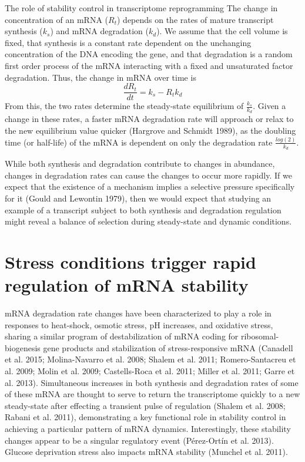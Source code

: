 The role of stability control in transcriptome
reprogramming The change in concentration of an mRNA ($R_t$) depends
on the rates of mature transcript synthesis ($k_s$) and mRNA
degradation ($k_d$). We assume that the cell volume is fixed, that
synthesis is a constant rate dependent on the unchanging concentration
of the DNA encoding the gene, and that degradation is a random first
order process of the mRNA interacting with a fixed and unsaturated
factor degradation. Thus, the change in mRNA over time is $$
\frac{dR_t}{dt} = k_s - R_t k_d$$ From this, the two rates determine
the steady-state equilibrium of $\frac{k_s}{k_d}$. Given a change in
these rates, a faster mRNA degradation rate will approach or relax to
the new equilibrium value quicker (Hargrove and Schmidt 1989), as the
doubling time (or half-life) of the mRNA is dependent on only the
degradation rate $\frac{log(2)}{k_d}$.  

While both synthesis and
degradation contribute to changes in abundance, changes in degradation
rates can cause the changes to occur more rapidly. If we expect that
the existence of a mechanism implies a selective pressure specifically
for it (Gould and Lewontin 1979), then we would expect that studying
an example of a transcript subject to both synthesis and degradation
regulation might reveal a balance of selection during steady-state and
dynamic conditions. 

\section{Stress conditions trigger rapid regulation of mRNA stability}

mRNA degradation rate changes have been characterized
to play a role in responses to heat-shock, osmotic stress, pH
increases, and oxidative stress, sharing a similar program of
destabilization of mRNA coding for ribosomal-biogenesis gene products
and stabilization of stress-responsive mRNA (Canadell et al. 2015;
Molina-Navarro et al. 2008; Shalem et al. 2011; Romero-Santacreu et
al. 2009; Molin et al. 2009; Castells-Roca et al. 2011; Miller et al.
2011; Garre et al. 2013). Simultaneous increases in both synthesis and
degradation rates of some of these mRNA are thought to serve to return
the transcriptome quickly to a new steady-state after effecting a
transient pulse of regulation (Shalem et al. 2008; Rabani et al.
2011), demonstrating a key functional role in stability control in
achieving a particular pattern of mRNA dynamics. Interestingly, these
stability changes appear to be a singular regulatory event
(Pérez-Ortín et al. 2013). Glucose deprivation stress also impacts
mRNA stability (Munchel et al. 2011). 

